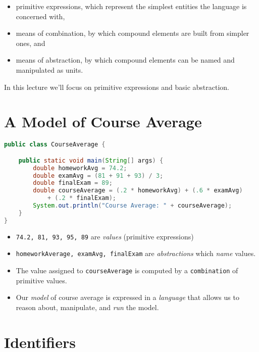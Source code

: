 \documentclass{article}
\begin{document}
\begin{itemize}
\item primitive expressions, which represent the simplest entities the language is concerned with,

\item means of combination, by which compound elements are built from simpler ones, and

\item means of abstraction, by which compound elements can be named and manipulated as units.
\end{itemize}

In this lecture we'll focus on primitive expressions and basic abstraction.




\section{A Model of Course Average}

\begin{lstlisting}[language=Java]
public class CourseAverage {

    public static void main(String[] args) {
        double homeworkAvg = 74.2;
        double examAvg = (81 + 91 + 93) / 3;
        double finalExam = 89;
        double courseAverage = (.2 * homeworkAvg) + (.6 * examAvg)
            + (.2 * finalExam);
        System.out.println("Course Average: " + courseAverage);
    }
}
\end{lstlisting}

\begin{itemize}
\item {\tt 74.2, 81, 93, 95, 89} are {\it values} (primitive expressions)
\item {\tt homeworkAverage, examAvg, finalExam} are {\it abstractions} which {\it name} values.
\item The value assigned to {\tt courseAverage} is computed by a {\tt combination} of primitive values.
\item Our {\it model} of course average is expressed in a {\it language} that allows us to reason about, manipulate, and {\it run} the model.
\end{itemize}





\section{Identifiers}
\end{document}
